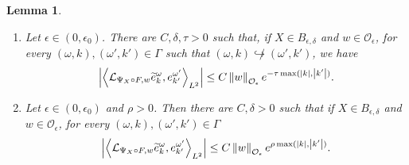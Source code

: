 \documentclass[10pt]{amsart}
\newtheorem{lemm}[theo]{Lemma}\newtheorem{prop}[theo]{Proposition}\newtheorem{coro}[theo]{Corollary}\newtheorem{conj}[theo]{Conjecture}
\theoremstyle{definition}\newtheorem{defi}[theo]{Definition}\newtheorem{rema}[theo]{Remark}\newtheorem{exam}[theo]{Example}\newtheorem{exem}[theo]{Example}\newtheorem{nota}[theo]{Notation}
\newcommand{\n}[1]{\left\|#1\right\|}
\newcommand{\va}[1]{\left|#1\right|}
\newcommand{\clO}{\mathcal{O}}
\newcommand{\clL}{\mathcal{L}}
\newcommand*{\romanenumi}{\renewcommand*{\theenumi}{\roman{enumi}}}
\let\oldtilde\tilde
\renewcommand*{\tilde}[1]{\mathchoice{\widetilde{#1}}{\widetilde{#1}}{\oldtilde{#1}}{\oldtilde{#1}}}
\begin{document}
\begin{lemm}\label{lemma:discard}\leavevmode
\begin{enumerate}\romanenumi
\item \label{item:discard_not}
Let $\epsilon \in (0,\epsilon_0)$. There are $C,\delta, \tau >0$ such that, if $X \in B_{\epsilon,\delta}$ and $w \in \clO_\epsilon$, for every $(\omega,k),(\omega',k') \in \Gamma$ such that $(\omega,k) \not\hookrightarrow (\omega',k')$, we have
\begin{equation*}
\va{\left\langle \clL_{\Psi_X \circ F,w} \tilde{e}_{k}^{\omega}, e_{k'}^{\omega'} \right\rangle_{L^2}} \leq C \n{w}_{\clO_\epsilon} e^{ - \tau \max(\va{k},\va{k'})}.
\end{equation*}
\item Let $\epsilon \in (0,\epsilon_0)$ and $\rho > 0$. Then there are $C, \delta > 0$ such that if $X \in B_{\epsilon,\delta}$ and $w \in \clO_\epsilon$, for every $(\omega,k),(\omega',k') \in \Gamma$
\begin{equation}\label{eq:weak_discard}
\va{\left\langle \clL_{\Psi_X \circ F,w} \tilde{e}_{k}^{\omega}, e_{k'}^{\omega'} \right\rangle_{L^2}} \leq C \n{w}_{\clO_\epsilon} e^{\rho \max(\va{k},\va{k'})}.
\end{equation}
\end{enumerate}
\end{lemm}
\end{document}
